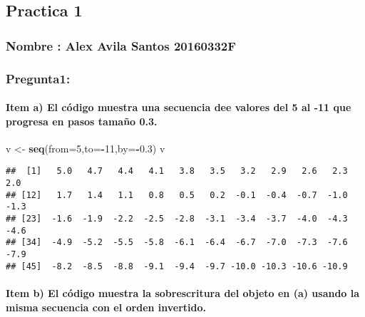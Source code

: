 \documentclass[]{article}
\title{}
\author{}
\date{}
\newenvironment{Shaded}{\begin{snugshade}}{\end{snugshade}}
\newcommand{\KeywordTok}[1]{\textcolor[rgb]{0.13,0.29,0.53}{\textbf{#1}}}
\newcommand{\DataTypeTok}[1]{\textcolor[rgb]{0.13,0.29,0.53}{#1}}
\newcommand{\DecValTok}[1]{\textcolor[rgb]{0.00,0.00,0.81}{#1}}
\newcommand{\FloatTok}[1]{\textcolor[rgb]{0.00,0.00,0.81}{#1}}
\newcommand{\StringTok}[1]{\textcolor[rgb]{0.31,0.60,0.02}{#1}}
\newcommand{\OperatorTok}[1]{\textcolor[rgb]{0.81,0.36,0.00}{\textbf{#1}}}
\newcommand{\NormalTok}[1]{#1}
\let\oldparagraph\paragraph
\renewcommand{\paragraph}[1]{\oldparagraph{#1}\mbox{}}
\begin{document}
\subsection{Practica 1}\label{practica-1}

\subsubsection{Nombre : Alex Avila Santos
20160332F}\label{nombre-alex-avila-santos-20160332f}

\subsubsection{Pregunta1:}\label{pregunta1}

\paragraph{Item a) El código muestra una secuencia dee valores del 5 al
-11 que progresa en pasos tamaño
0.3.}\label{item-a-el-codigo-muestra-una-secuencia-dee-valores-del-5-al--11-que-progresa-en-pasos-tamano-0.3.}

\begin{Shaded}
\begin{Highlighting}[]
\NormalTok{v <-}\StringTok{ }\KeywordTok{seq}\NormalTok{(}\DataTypeTok{from=}\DecValTok{5}\NormalTok{,}\DataTypeTok{to=}\OperatorTok{-}\DecValTok{11}\NormalTok{,}\DataTypeTok{by=}\OperatorTok{-}\FloatTok{0.3}\NormalTok{)}
\NormalTok{v}
\end{Highlighting}
\end{Shaded}

\begin{verbatim}
##  [1]   5.0   4.7   4.4   4.1   3.8   3.5   3.2   2.9   2.6   2.3   2.0
## [12]   1.7   1.4   1.1   0.8   0.5   0.2  -0.1  -0.4  -0.7  -1.0  -1.3
## [23]  -1.6  -1.9  -2.2  -2.5  -2.8  -3.1  -3.4  -3.7  -4.0  -4.3  -4.6
## [34]  -4.9  -5.2  -5.5  -5.8  -6.1  -6.4  -6.7  -7.0  -7.3  -7.6  -7.9
## [45]  -8.2  -8.5  -8.8  -9.1  -9.4  -9.7 -10.0 -10.3 -10.6 -10.9
\end{verbatim}

\paragraph{Item b) El código muestra la sobrescritura del objeto en (a)
usando la misma secuencia con el orden
invertido.}\label{item-b-el-codigo-muestra-la-sobrescritura-del-objeto-en-a-usando-la-misma-secuencia-con-el-orden-invertido.}
\end{document}
